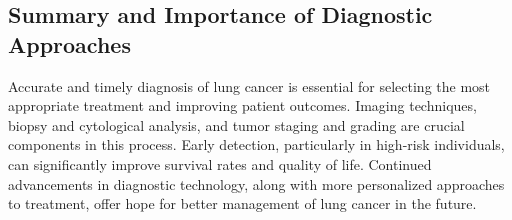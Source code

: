 
\newpage

\subsection{Summary and Importance of Diagnostic Approaches}

Accurate and timely diagnosis of lung cancer is essential for selecting the most appropriate 
treatment and improving patient outcomes. Imaging techniques, biopsy and cytological analysis, and 
tumor staging and grading are crucial components in this process. Early detection, particularly in 
high-risk individuals, can significantly improve survival rates and quality of life. Continued 
advancements in diagnostic technology, along with more personalized approaches to treatment, offer 
hope for better management of lung cancer in the future.
